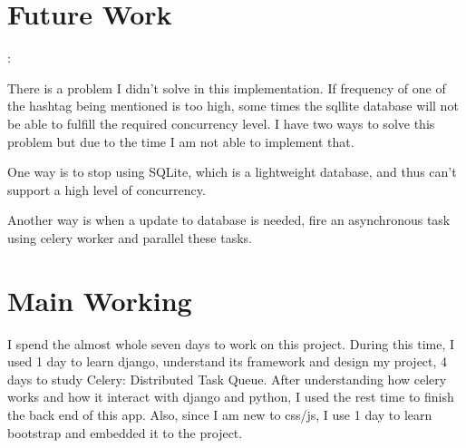 \documentclass[11pt,letterpaper]{article}
\begin{document}
\section{Future Work}:

There is a problem I didn't solve in this implementation. If frequency of one of the hashtag being mentioned is too high, some times the sqllite database will not be able to fulfill the required concurrency level. I have two ways to solve this problem but due to the time I am not able to implement that.

One way is to stop using SQLite, which is a lightweight database, and thus can’t support a high level of concurrency.

Another way is when a update to database is needed, fire an asynchronous task using celery worker and parallel these tasks.


\section{Main Working}

I spend the almost whole seven days to work on this project. During this time, I used 1 day to learn django, understand its framework and design my project, 4 days to study Celery: Distributed Task Queue. After understanding how celery works and how it interact with django and python, I used the rest time to finish the back end of this app.  Also, since I am new to css/js, I use 1 day to learn bootstrap and embedded it to the project.
\end{document}
